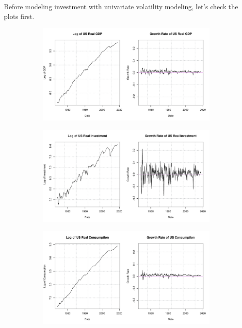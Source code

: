 \documentclass[12pt]{article}
\theoremstyle{definition}
\numberwithin{equation}{section}
\numberwithin{figure}{section}
\numberwithin{table}{section}
\begin{document}
Before modeling investment with univariate volatility modeling, let's check the plots first.
\begin{figure}[H]
  \centering
  \begin{subfigure}[b]{0.85\textwidth}
    \centering
    \includegraphics[width=\textwidth]{../Figures/usrealgdp}
  \end{subfigure}
  \begin{subfigure}[b]{0.85\textwidth}
    \centering
    \includegraphics[width=\textwidth]{../Figures/usInv}
  \end{subfigure}
  \begin{subfigure}[b]{0.85\textwidth}
    \centering
    \includegraphics[width=\textwidth]{../Figures/usCons}
  \end{subfigure}
\end{figure}



























\newpage


\end{document}

